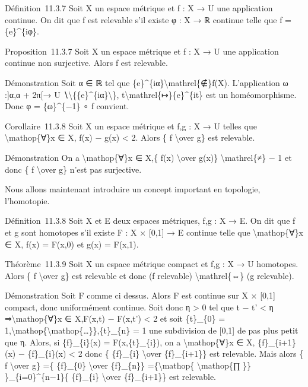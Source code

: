 \documentclass[]{article}
\begin{document}
Définition~11.3.7 Soit X un espace métrique et f : X → U une application
continue. On dit que f est relevable s'il existe φ : X → ℝ continue
telle que f = \{e\}\^{}\{iφ\}.

Proposition~11.3.7 Soit X un espace métrique et f : X → U une
application continue non surjective. Alors f est relevable.

Démonstration Soit α ∈ ℝ tel que
\{e\}\^{}\{iα\}\textbackslash{}mathrel\{∉\}f(X). L'application ω :{]}α,α
+ 2π{[}→ U ∖\textbackslash{}\{\{e\}\^{}\{iα\}\textbackslash{}\},
t\textbackslash{}mathrel\{↦\}\{e\}\^{}\{it\} est un homéomorphisme. Donc
φ = \{ω\}\^{}\{−1\} ∘ f convient.

Corollaire~11.3.8 Soit X un espace métrique et f,g : X → U telles que
\textbackslash{}mathop\{∀\}x ∈ X, \textbar{}f(x) − g(x)\textbar{}
\textless{} 2. Alors \{ f \textbackslash{}over g\} est relevable.

Démonstration On a \textbackslash{}mathop\{∀\}x ∈ X,\{ f(x)
\textbackslash{}over g(x)\} \textbackslash{}mathrel\{≠\} − 1 et donc \{
f \textbackslash{}over g\} n'est pas surjective.

Nous allons maintenant introduire un concept important en topologie,
l'homotopie.

Définition~11.3.8 Soit X et E deux espaces métriques, f,g : X → E. On
dit que f et g sont homotopes s'il existe F : X × {[}0,1{]} → E continue
telle que \textbackslash{}mathop\{∀\}x ∈ X, f(x) = F(x,0) et g(x) =
F(x,1).

Théorème~11.3.9 Soit X un espace métrique compact et f,g : X → U
homotopes. Alors \{ f \textbackslash{}over g\} est relevable et donc (f
relevable) \textbackslash{}mathrel\{⇔\} (g relevable).

Démonstration Soit F comme ci dessus. Alors F est continue sur X ×
{[}0,1{]} compact, donc uniformément continue. Soit donc η
\textgreater{} 0 tel que \textbar{}t − t'\textbar{} \textless{} η
⇒\textbackslash{}mathop\{∀\}x ∈ X,\textbar{}F(x,t) − F(x,t')\textbar{}
\textless{} 2 et soit \{t\}\_\{0\} =
1,\textbackslash{}mathop\{\textbackslash{}mathop\{\ldots{}\}\},\{t\}\_\{n\}
= 1 une subdivision de {[}0,1{]} de pas plus petit que η. Alors, si
\{f\}\_\{i\}(x) = F(x,\{t\}\_\{i\}), on a \textbackslash{}mathop\{∀\}x ∈
X, \textbar{}\{f\}\_\{i+1\}(x) − \{f\}\_\{i\}(x)\textbar{} \textless{} 2
donc \{ \{f\}\_\{i\} \textbackslash{}over \{f\}\_\{i+1\}\} est
relevable. Mais alors \{ f \textbackslash{}over g\} =\{ \{f\}\_\{0\}
\textbackslash{}over \{f\}\_\{n\}\} =\{\textbackslash{}mathop\{
\textbackslash{}mathop\{∏ \}\} \}\_\{i=0\}\^{}\{n−1\}\{ \{f\}\_\{i\}
\textbackslash{}over \{f\}\_\{i+1\}\} est relevable.
\end{document}
